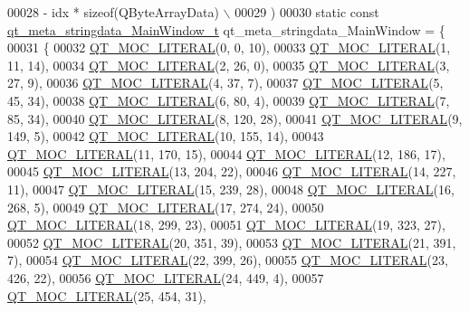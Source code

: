 \begin{DoxyCode}
00028 \textcolor{preprocessor}{        - idx * sizeof(QByteArrayData) \(\backslash\)}
00029 \textcolor{preprocessor}{    )}
00030 \textcolor{keyword}{static} \textcolor{keyword}{const} \hyperlink{a00066_da/deb/a00189}{qt\_meta\_stringdata\_MainWindow\_t} qt\_meta\_stringdata\_MainWindow =
       \{
00031     \{
00032 \hyperlink{a00066_a75bb9482d242cde0a06c9dbdc6b83abe}{QT\_MOC\_LITERAL}(0, 0, 10),
00033 \hyperlink{a00066_a75bb9482d242cde0a06c9dbdc6b83abe}{QT\_MOC\_LITERAL}(1, 11, 14),
00034 \hyperlink{a00066_a75bb9482d242cde0a06c9dbdc6b83abe}{QT\_MOC\_LITERAL}(2, 26, 0),
00035 \hyperlink{a00066_a75bb9482d242cde0a06c9dbdc6b83abe}{QT\_MOC\_LITERAL}(3, 27, 9),
00036 \hyperlink{a00066_a75bb9482d242cde0a06c9dbdc6b83abe}{QT\_MOC\_LITERAL}(4, 37, 7),
00037 \hyperlink{a00066_a75bb9482d242cde0a06c9dbdc6b83abe}{QT\_MOC\_LITERAL}(5, 45, 34),
00038 \hyperlink{a00066_a75bb9482d242cde0a06c9dbdc6b83abe}{QT\_MOC\_LITERAL}(6, 80, 4),
00039 \hyperlink{a00066_a75bb9482d242cde0a06c9dbdc6b83abe}{QT\_MOC\_LITERAL}(7, 85, 34),
00040 \hyperlink{a00066_a75bb9482d242cde0a06c9dbdc6b83abe}{QT\_MOC\_LITERAL}(8, 120, 28),
00041 \hyperlink{a00066_a75bb9482d242cde0a06c9dbdc6b83abe}{QT\_MOC\_LITERAL}(9, 149, 5),
00042 \hyperlink{a00066_a75bb9482d242cde0a06c9dbdc6b83abe}{QT\_MOC\_LITERAL}(10, 155, 14),
00043 \hyperlink{a00066_a75bb9482d242cde0a06c9dbdc6b83abe}{QT\_MOC\_LITERAL}(11, 170, 15),
00044 \hyperlink{a00066_a75bb9482d242cde0a06c9dbdc6b83abe}{QT\_MOC\_LITERAL}(12, 186, 17),
00045 \hyperlink{a00066_a75bb9482d242cde0a06c9dbdc6b83abe}{QT\_MOC\_LITERAL}(13, 204, 22),
00046 \hyperlink{a00066_a75bb9482d242cde0a06c9dbdc6b83abe}{QT\_MOC\_LITERAL}(14, 227, 11),
00047 \hyperlink{a00066_a75bb9482d242cde0a06c9dbdc6b83abe}{QT\_MOC\_LITERAL}(15, 239, 28),
00048 \hyperlink{a00066_a75bb9482d242cde0a06c9dbdc6b83abe}{QT\_MOC\_LITERAL}(16, 268, 5),
00049 \hyperlink{a00066_a75bb9482d242cde0a06c9dbdc6b83abe}{QT\_MOC\_LITERAL}(17, 274, 24),
00050 \hyperlink{a00066_a75bb9482d242cde0a06c9dbdc6b83abe}{QT\_MOC\_LITERAL}(18, 299, 23),
00051 \hyperlink{a00066_a75bb9482d242cde0a06c9dbdc6b83abe}{QT\_MOC\_LITERAL}(19, 323, 27),
00052 \hyperlink{a00066_a75bb9482d242cde0a06c9dbdc6b83abe}{QT\_MOC\_LITERAL}(20, 351, 39),
00053 \hyperlink{a00066_a75bb9482d242cde0a06c9dbdc6b83abe}{QT\_MOC\_LITERAL}(21, 391, 7),
00054 \hyperlink{a00066_a75bb9482d242cde0a06c9dbdc6b83abe}{QT\_MOC\_LITERAL}(22, 399, 26),
00055 \hyperlink{a00066_a75bb9482d242cde0a06c9dbdc6b83abe}{QT\_MOC\_LITERAL}(23, 426, 22),
00056 \hyperlink{a00066_a75bb9482d242cde0a06c9dbdc6b83abe}{QT\_MOC\_LITERAL}(24, 449, 4),
00057 \hyperlink{a00066_a75bb9482d242cde0a06c9dbdc6b83abe}{QT\_MOC\_LITERAL}(25, 454, 31),

\end{DoxyCode}
